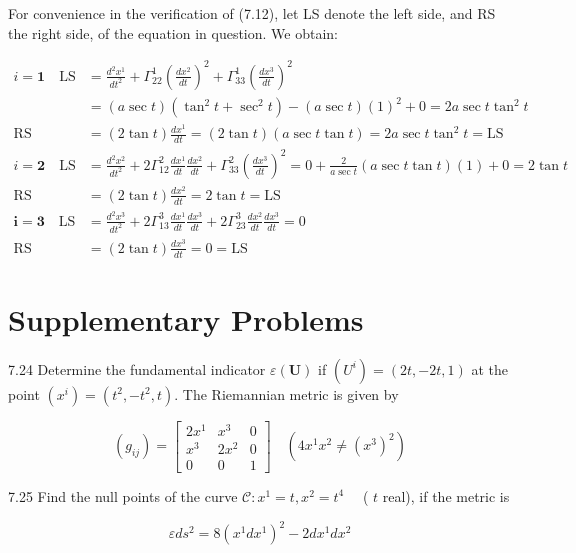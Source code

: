 \documentclass[10pt]{article}
\begin{document}
For convenience in the verification of (7.12), let LS denote the left side, and RS the right side, of the equation in question. We obtain:

$$
\begin{aligned}
i=\mathbf{1} \quad \mathrm{LS} & =\frac{d^{2} x^{1}}{d t^{2}}+\Gamma_{22}^{1}\left(\frac{d x^{2}}{d t}\right)^{2}+\Gamma_{33}^{1}\left(\frac{d x^{3}}{d t}\right)^{2} \\
& =(a \sec t)\left(\tan ^{2} t+\sec ^{2} t\right)-(a \sec t)(1)^{2}+0=2 a \sec t \tan ^{2} t \\
\mathrm{RS} & =(2 \tan t) \frac{d x^{1}}{d t}=(2 \tan t)(a \sec t \tan t)=2 a \sec t \tan ^{2} t=\mathrm{LS} \\
i=\mathbf{2} \quad \mathrm{LS} & =\frac{d^{2} x^{2}}{d t^{2}}+2 \Gamma_{12}^{2} \frac{d x^{1}}{d t} \frac{d x^{2}}{d t}+\Gamma_{33}^{2}\left(\frac{d x^{3}}{d t}\right)^{2}=0+\frac{2}{a \sec t}(a \sec t \tan t)(1)+0=2 \tan t \\
\mathrm{RS} & =(2 \tan t) \frac{d x^{2}}{d t}=2 \tan t=\mathrm{LS} \\
\boldsymbol{i}=\mathbf{3} \quad \mathrm{LS} & =\frac{d^{2} x^{3}}{d t^{2}}+2 \Gamma_{13}^{3} \frac{d x^{1}}{d t} \frac{d x^{3}}{d t}+2 \Gamma_{23}^{3} \frac{d x^{2}}{d t} \frac{d x^{3}}{d t}=0 \\
\mathrm{RS} & =(2 \tan t) \frac{d x^{3}}{d t}=0=\mathrm{LS}
\end{aligned}
$$

\section*{Supplementary Problems}
7.24 Determine the fundamental indicator $\varepsilon(\mathbf{U})$ if $\left(U^{i}\right)=(2 t,-2 t, 1)$ at the point $\left(x^{i}\right)=\left(t^{2},-t^{2}, t\right)$. The Riemannian metric is given by

$$
\left(g_{i j}\right)=\left[\begin{array}{ccc}
2 x^{1} & x^{3} & 0 \\
x^{3} & 2 x^{2} & 0 \\
0 & 0 & 1
\end{array}\right] \quad\left(4 x^{1} x^{2} \neq\left(x^{3}\right)^{2}\right)
$$

7.25 Find the null points of the curve $\mathscr{C}: x^{1}=t, x^{2}=t^{4} \quad$ ( $t$ real), if the metric is

$$
\varepsilon d s^{2}=8\left(x^{1} d x^{1}\right)^{2}-2 d x^{1} d x^{2}
$$
\end{document}
